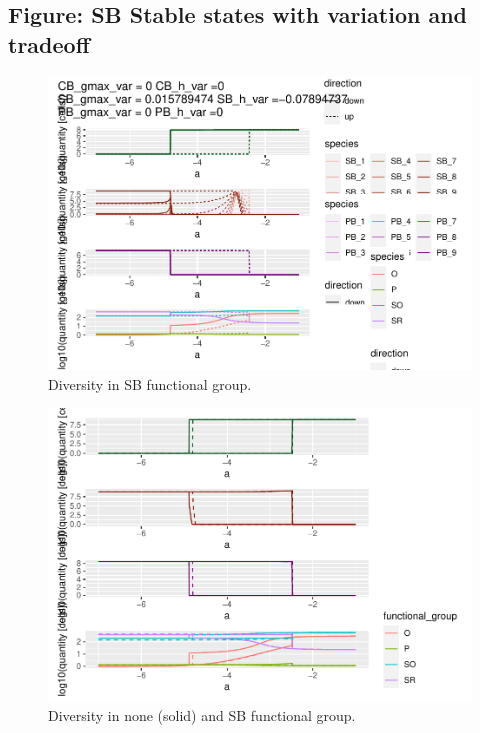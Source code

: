 \documentclass{article}
\begin{document}
\hypertarget{figure-sb-stable-states-with-variation-and-tradeoff}{%
\subsection{Figure: SB Stable states with variation and
tradeoff}\label{figure-sb-stable-states-with-variation-and-tradeoff}}

\begin{figure}

{\centering \includegraphics[width=1\linewidth]{article_files/figure-latex/SB_var1-1} 

}

\caption{Diversity in SB functional group.}\label{fig:SB_var1}
\end{figure}

\begin{figure}

{\centering \includegraphics[width=1\linewidth]{article_files/figure-latex/SB_var2-1} 

}

\caption{Diversity in none (solid) and SB functional group.}\label{fig:SB_var2}
\end{figure}
\end{document}
